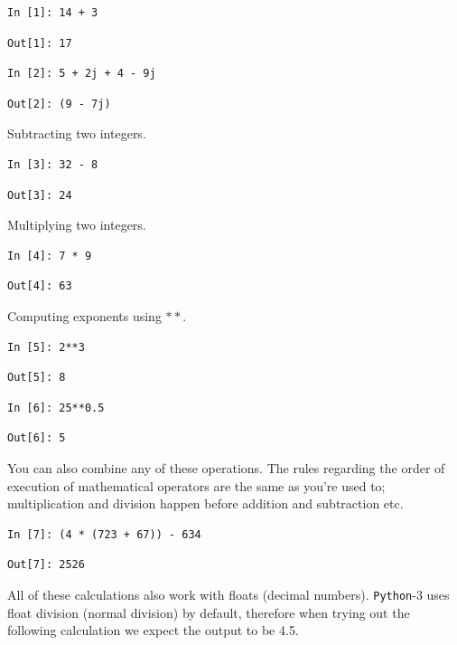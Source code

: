 \begin{lstlisting}[style=PY]
In [1]: 14 + 3
\end{lstlisting}
\begin{lstlisting}[style=PY, backgroundcolor=\color{white}]
Out[1]: 17
\end{lstlisting}
\begin{lstlisting}[style=PY]
In [2]: 5 + 2j + 4 - 9j
\end{lstlisting}
\begin{lstlisting}[style=PY, backgroundcolor=\color{white}]
Out[2]: (9 - 7j)
\end{lstlisting} 
Subtracting two integers.
\begin{lstlisting}[style=PY]
In [3]: 32 - 8
\end{lstlisting}
\begin{lstlisting}[style=PY, backgroundcolor=\color{white}]
Out[3]: 24
\end{lstlisting}
Multiplying two integers.
\begin{lstlisting}[style=PY]
In [4]: 7 * 9
\end{lstlisting}
\begin{lstlisting}[style=PY, backgroundcolor=\color{white}]
Out[4]: 63
\end{lstlisting}
Computing exponents using $\ast\ast$.
\begin{lstlisting}[style=PY]
In [5]: 2**3
\end{lstlisting}
\begin{lstlisting}[style=PY, backgroundcolor=\color{white}]
Out[5]: 8
\end{lstlisting}
\begin{lstlisting}[style=PY]
In [6]: 25**0.5
\end{lstlisting}
\begin{lstlisting}[style=PY, backgroundcolor=\color{white}]
Out[6]: 5
\end{lstlisting}
You can also combine any of these operations. The rules regarding the order of execution of mathematical operators are the same as you're used to; multiplication and division happen before addition and subtraction etc.
\begin{lstlisting}[style=PY]
In [7]: (4 * (723 + 67)) - 634
\end{lstlisting}
\begin{lstlisting}[style=PY, backgroundcolor=\color{white}]
Out[7]: 2526
\end{lstlisting}
\noindent All of these calculations also work with floats (decimal numbers). \texttt{Python}-3 uses float division (normal division)  by default, therefore when trying out the following calculation we expect the output to be 4.5.
